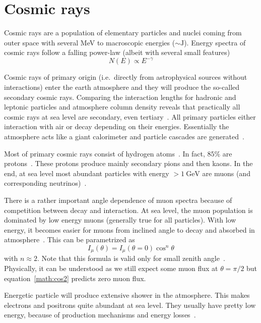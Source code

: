 \section{Cosmic rays}\label{sec:theo}
Cosmic rays are a population of elementary particles and nuclei coming from outer space with several \si{\mega\eV} to macroscopic energies ($\sim\si{\joule}$). Energy spectra of cosmic rays follow a falling power-law (albeit with several small features)~\cite{PDG}~\cite{Gaisser}
\begin{equation*}
	N(E) \propto E^{-\gamma}
\end{equation*}

Cosmic rays of primary origin (i.e.~directly from astrophysical sources without interactions) enter the earth atmosphere and they will produce the so-called secondary cosmic rays. Comparing the interaction lengths for hadronic and leptonic particles and atmosphere column density reveals that practically all cosmic rays at sea level are secondary, even tertiary~\cite{grupen}. All primary particles either interaction with air or decay depending on their energies. Essentially the atmosphere acts like a giant calorimeter and particle cascades are generated~\cite{grupen}.

Most of primary cosmic rays consist of hydrogen atoms~\cite{Gaisser}. In fact, $85\%$ are protons~\cite{grupen}. These protons produce mainly secondary pions and then kaons. In the end, at sea level most abundant particles with energy $>\SI{1}{\giga\eV}$ are muons (and corresponding neutrinos)~\cite{PDG}. 

There is a rather important angle dependence of muon spectra because of competition between decay and interaction. At sea level, the muon population is dominated by low energy muons (generally true for all particles). With low energy, it becomes easier for muons from inclined angle to decay and absorbed in atmosphere~\cite{grupen}. This can be parametrized as~\cite{grupen}
\begin{equation}
	I_\mu (\theta) = I_\mu (\theta = 0) \cos^n \theta
	\label{math:cos2}
\end{equation}
with $n\approx 2$. Note that this formula is valid only for small zenith angle~\cite{Shukla}. Physically, it can be understood as we still expect some muon flux at $\theta=\pi/2$ but equation~\ref{math:cos2} predicts zero muon flux.

Energetic particle will produce extensive shower in the atmosphere.	This makes electrons and positrons quite abundant at sea level. They usually have pretty low energy, because of production mechanisms and energy losses~\cite{grupen}.
